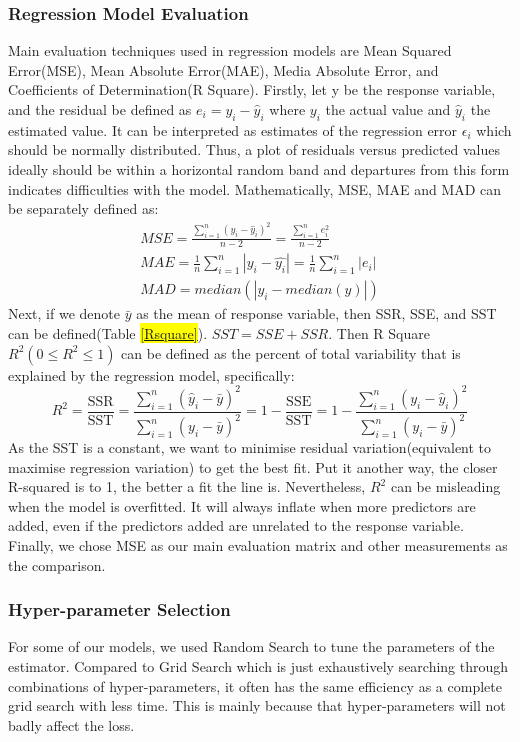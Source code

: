 \subsubsection{Regression Model Evaluation}
Main evaluation techniques used in regression models  are Mean Squared Error(MSE), Mean Absolute Error(MAE), Media Absolute Error, and Coefficients of Determination(R Square). Firstly, let y be the response variable, and the residual be defined as $e_i = y_i - \hat y_i$ where $y_i$ the actual value and $\hat y_i$ the estimated value. It can be interpreted as estimates of the regression error $\epsilon_i$ which should be normally distributed. Thus, a plot of residuals versus predicted values ideally should be within a horizontal random band and departures from this form indicates difficulties with the model. Mathematically, MSE, MAE and MAD can be separately defined as: 
\begin{align}
MSE=\frac{\sum_{i=1}^{n}(y_i-\hat{y}_i)^2}{n-2}=\frac{\sum_{i=1}^{n}e_i^2}{n-2} \\
MAE = \frac{1}{n}\sum_{i=1}^n \left| y_i - \hat{y_i}\right| =\frac{1}{n}\sum_{i=1}^n \left| e_i \right|  \\
MAD= median(|y_i-median(y)|)
\end{align}
Next, if we denote $\bar{y}$ as the mean of response variable, then SSR, SSE, and SST can be defined(Table \hl{\ref{Rsquare}}). $SST=SSE+SSR$. Then R Square $R^2(0 \leq R^2 \leq 1)$ can be defined as the percent of total variability that is explained by the regression model, specifically:
\begin{equation}
R^2 = \frac{\text{SSR}}{\text{SST}} = \frac{\sum_{i=1}^n (\hat y_i - \bar y)^2}{\sum_{i=1}^n (y_i - \bar y)^2} = 1 - \frac{\text{SSE}}{\text{SST}} = 1 - \frac{\sum_{i=1}^n (y_i - \hat y_i)^2}{\sum_{i=1}^n (y_i - \bar y)^2}
\end{equation}
As the SST is a constant, we want to minimise residual variation(equivalent to maximise regression variation) to get the best fit. Put it another way, the closer R-squared is to 1, the better a fit the line is. Nevertheless, $R^2$ can be misleading when the model is overfitted. It will always inflate when more predictors are added, even if the predictors added are unrelated to the response variable. Finally, we chose MSE as our main evaluation matrix and other measurements as the comparison.
\subsubsection{Hyper-parameter Selection}
For some of our models, we used Random Search to tune the parameters of the estimator. Compared to Grid Search which is just exhaustively searching through combinations of hyper-parameters, it often has the same efficiency as a complete grid search with less time. This is mainly because that hyper-parameters will not badly affect the loss.
